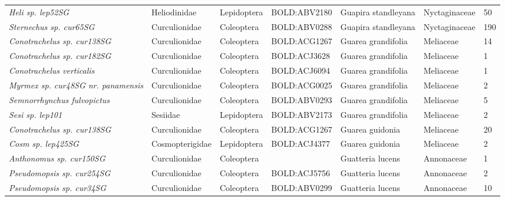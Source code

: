 \documentclass[11pt]{article}
\begin{document}
\begin{landscape}
\begin{longtable}{@{}lllllll@{}}
\textit{Heli sp. lep52SG}                             & Heliodinidae    & Lepidoptera  & BOLD:ABV2180 & Guapira standleyana                & Nyctaginaceae    & 50    \\
\textit{Sternechus sp. cur65SG}                       & Curculionidae   & Coleoptera   & BOLD:ABV0288 & Guapira standleyana                & Nyctaginaceae    & 190   \\
\textit{Conotrachelus sp. cur138SG}                   & Curculionidae   & Coleoptera   & BOLD:ACG1267 & Guarea grandifolia                 & Meliaceae        & 14    \\
\textit{Conotrachelus sp. cur182SG}                   & Curculionidae   & Coleoptera   & BOLD:ACJ3628 & Guarea grandifolia                 & Meliaceae        & 1     \\
\textit{Conotrachelus verticalis}                     & Curculionidae   & Coleoptera   & BOLD:ACJ6094 & Guarea grandifolia                 & Meliaceae        & 1     \\
\textit{Myrmex sp. cur48SG nr. panamensis}            & Curculionidae   & Coleoptera   & BOLD:ACG0025 & Guarea grandifolia                 & Meliaceae        & 2     \\
\textit{Semnorrhynchus fulvopictus}                   & Curculionidae   & Coleoptera   & BOLD:ABV0293 & Guarea grandifolia                 & Meliaceae        & 5     \\
\textit{Sesi sp. lep101}                              & Sesiidae        & Lepidoptera  & BOLD:ABV2173 & Guarea grandifolia                 & Meliaceae        & 2     \\
\textit{Conotrachelus sp. cur138SG}                   & Curculionidae   & Coleoptera   & BOLD:ACG1267 & Guarea guidonia                    & Meliaceae        & 20    \\
\textit{Cosm sp. lep425SG}                            & Cosmopterigidae & Lepidoptera  & BOLD:ACJ4377 & Guarea guidonia                    & Meliaceae        & 2     \\
\textit{Anthonomus sp. cur150SG}                      & Curculionidae   & Coleoptera   &              & Guatteria lucens                   & Annonaceae       & 1     \\
\textit{Pseudomopsis sp. cur254SG}                    & Curculionidae   & Coleoptera   & BOLD:ACJ5756 & Guatteria lucens                   & Annonaceae       & 2     \\
\textit{Pseudomopsis sp. cur34SG}                     & Curculionidae   & Coleoptera   & BOLD:ABV0299 & Guatteria lucens                   & Annonaceae       & 10    \\

\end{longtable}
\end{landscape}
\end{document}
